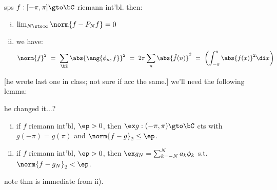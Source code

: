 \begin{thm}[title=Parseval/Plancherel]
	sps $f:[-\pi,\pi]\gto\bC$ riemann int'bl. then:
	\begin{enumerate}[i)]
		\item $\lim_{N\sto\infty}\norm{f-P_{N}f}=0$
		\item we have:
			\begin{equation*}
				\norm{f}^{2} \ = \ \sum_{\bZ}\abs{\ang{\phi_{n},f}}^{2}
				\ = \ 2\pi\sum_{n}\abs{\hat{f}(n)}^{2}
				\ = \ \left(\int_{-\pi}^{\pi}\abs{f(x)}^{2}\di x\right)
			\end{equation*}
	\end{enumerate}
\end{thm}
[he wrote last one in class; not sure if acc the same.]
we'll need the following lemma:
\begin{lm}
	he changed it...?
	\begin{enumerate}[i)]
		\item if $f$ riemann int'bl, $\ep>0$, then
			$\ex g:(-\pi,\pi)\gto\bC$ cts with $g(-\pi)=g(\pi)$ and
			$\norm{f-g}_{2}\leq\ep$.
		\item if $f$ riemann int'bl, $\ep>0$, then
			$\ex g_{N}=\sum_{k=-N}^{N}a_{k}\phi_{k}$ s.t. $\norm{f-g_{N}}_{2}<\ep$.
	\end{enumerate}
\end{lm}
note thm is immediate from ii).

